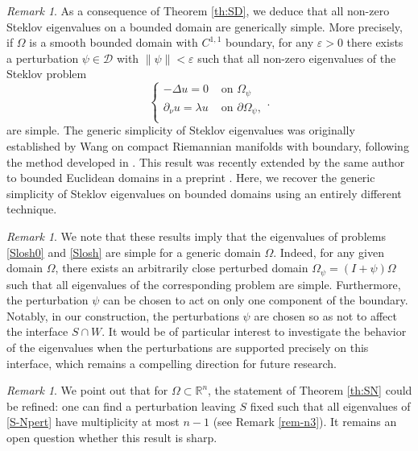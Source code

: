 \documentclass[a4paper,reqno,11pt,oneside]{amsart}
\theoremstyle{plain}
\theoremstyle{plain}
\theoremstyle{plain}
\theoremstyle{remark}
\newtheorem{remark}[thm]{Remark}
\begin{document}
\begin{remark}
As a consequence of Theorem \ref{th:SD}, we deduce that all non-zero Steklov eigenvalues on a bounded domain are generically simple. More precisely, if $\Omega$ is a smooth bounded domain with $C^{1,1}$ boundary, for any $\varepsilon > 0$ there exists a perturbation $\psi \in \mathcal{D}$ with $\|\psi\| < \varepsilon$ such that all non-zero eigenvalues of the Steklov problem
\begin{equation}\label{eq:steklov-pert}
\left\{
    \begin{array}{cc}
         -\Delta u=0& \text{ on } \Omega_\psi\\
        \partial_\nu u=\lambda u & \text{ on } \partial \Omega_\psi,\\
           \end{array}.
    \right.
 \end{equation}
are simple.
The generic simplicity of Steklov eigenvalues was originally established by Wang \cite{wang} on compact Riemannian manifolds with boundary, following the method developed in \cite{u}. This result was recently extended by the same author to bounded Euclidean domains in a preprint \cite{wangpre}. Here, we recover the generic simplicity of Steklov eigenvalues on bounded domains using an entirely different technique.
\end{remark}

\begin{remark}
We note that these results imply that the eigenvalues of problems \eqref{Slosh0} and \eqref{Slosh} are simple for a generic domain $\Omega$. Indeed, for any given domain $\Omega$, there exists an arbitrarily close perturbed domain $\Omega_\psi = (I + \psi)\Omega$ such that all eigenvalues of the corresponding problem are simple. Furthermore, the perturbation $\psi$ can be chosen to act on only one component of the boundary. Notably, in our construction, the perturbations $\psi$ are chosen so as not to affect the interface $S \cap W$. It would be of particular interest to investigate the behavior of the eigenvalues when the perturbations are supported precisely on this interface, which remains a compelling direction for future research.
\end{remark}

\begin{remark}
We point out that for $\Omega \subset \mathbb{R}^n$, the statement of Theorem \ref{th:SN} could be refined: one can find a perturbation leaving $S$ fixed such that all eigenvalues of \eqref{S-Npert} have multiplicity at most $n-1$ (see Remark \ref{rem-n3}). It remains an open question whether this result is sharp.
\end{remark}
\end{document}
